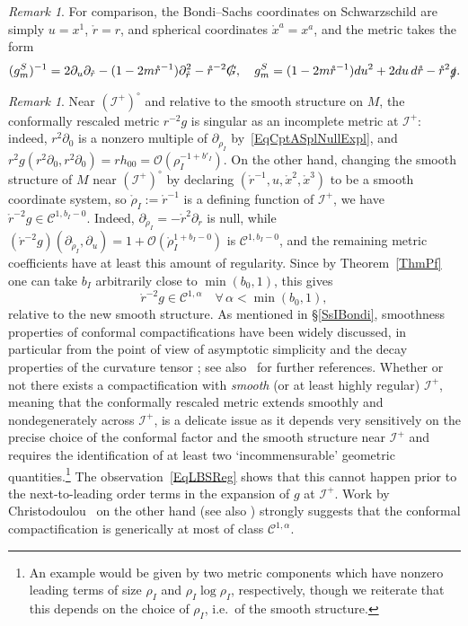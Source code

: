 \documentclass[reqno,11pt,letterpaper]{amsart}
\numberwithin{equation}{section}
\numberwithin{figure}{section}
\theoremstyle{definition}
\theoremstyle{remark}
\newtheorem{rmk}[thm]{Remark}
\newcommand{\mc}{\mathcal}
\newcommand{\cC}{\mc C}
\newcommand{\cO}{\mc O}
\newcommand{\ms}{\mathscr}
\newcommand{\scri}{\ms I}
\newcommand{\slg}{\slashed{g}{}}
\newcommand{\slG}{\slashed{G}{}}
\newcommand{\pa}{\partial}
\begin{document}
\begin{rmk}
  For comparison, the Bondi--Sachs coordinates on Schwarzschild are simply $u=x^1$, $\mathring r=r$, and spherical coordinates $\mathring x^a=x^a$, and the metric takes the form
  \[
    (g_m^S)^{-1} = 2\pa_u\pa_{\mathring r} - (1-2 m\mathring r^{-1})\pa_{\mathring r}^2 - \mathring r^{-2}\slG,\quad
    g_m^S = (1-2 m\mathring r^{-1})d u^2+2 d u\,d\mathring r-\mathring r^2\slg.
  \]
\end{rmk}

\begin{rmk}
\label{RmkLBSReg}
  Near $(\scri^+)^\circ$ and relative to the smooth structure on $M$, the conformally rescaled metric $r^{-2}g$ is singular as an incomplete metric at $\scri^+$: indeed, $r^2\pa_0$ is a nonzero multiple of $\pa_{\rho_I}$ by~\eqref{EqCptASplNullExpl}, and $r^2 g(r^2\pa_0,r^2\pa_0)=r h_{0 0}=\cO(\rho_I^{-1+b'_I})$. On the other hand, changing the smooth structure of $M$ near $(\scri^+)^\circ$ by declaring $(\mathring r^{-1},u,\mathring x^2,\mathring x^3)$ to be a smooth coordinate system, so $\mathring\rho_I:=\mathring r^{-1}$ is a defining function of $\scri^+$, we have $\mathring r^{-2} g\in\cC^{1,b_I-0}$. Indeed, $\pa_{\mathring\rho_I}=-\mathring r^2\pa_{\mathring r}$ is null, while $(\mathring r^{-2}g)(\pa_{\mathring\rho_I},\pa_u)=1+\cO(\mathring\rho_I^{1+b_I-0})$ is $\cC^{1,b_I-0}$, and the remaining metric coefficients have at least this amount of regularity. Since by Theorem~\ref{ThmPf} one can take $b_I$ arbitrarily close to $\min(b_0,1)$, this gives
  \begin{equation}
  \label{EqLBSReg}
    \mathring r^{-2}g \in \cC^{1,\alpha}\quad \forall\,\alpha<\min(b_0,1),
  \end{equation}
  relative to the new smooth structure. As mentioned in \S\ref{SsIBondi}, smoothness properties of conformal compactifications have been widely discussed, in particular from the point of view of asymptotic simplicity \cite{PenroseAsymptotics} and the decay properties of the curvature tensor \cite{KlainermanNicoloPeeling,ChristodoulouNoPeeling}; see also~\cite{FriedrichSmoothScriReview} for further references. Whether or not there exists a compactification with \emph{smooth} (or at least highly regular) $\scri^+$, meaning that the conformally rescaled metric extends smoothly and nondegenerately across $\scri^+$, is a delicate issue as it depends very sensitively on the precise choice of the conformal factor and the smooth structure near $\scri^+$ and requires the identification of at least two `incommensurable' geometric quantities.\footnote{An example would be given by two metric components which have nonzero leading terms of size $\rho_I$ and $\rho_I\log\rho_I$, respectively, though we reiterate that this depends on the choice of $\rho_I$, i.e.\ of the smooth structure.} The observation~\eqref{EqLBSReg} shows that this cannot happen prior to the next-to-leading order terms in the expansion of $g$ at $\scri^+$. Work by Christodoulou~\cite{ChristodoulouNoPeeling} on the other hand (see also \cite[\S1.5.3]{DafermosChristodoulouExpose}) strongly suggests that the conformal compactification is generically at most of class $\cC^{1,\alpha}$.
\end{rmk}
\end{document}
